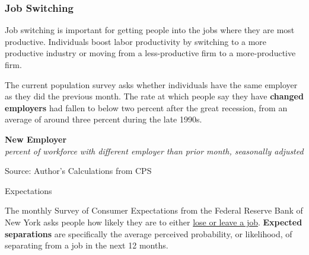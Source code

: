 \documentclass{report}
\makeatletter
\newcommand{\tbllink}[1]{\href{https://raw.githubusercontent.com/bdecon/US-chartbook/master/chartbook/data/#1}{\faTable}}
\newcommand*\short[1]{\expandafter\@gobbletwo\number\numexpr#1\relax}
\newcommand{\dateaxisticks}{
		date coordinates in=x, axis line style={draw=none},
		xmax={2024-01-31},
		max space between ticks=40,	    
		xtick={{1990-01-01}, {1992-01-01}, {1994-01-01}, 
			{1996-01-01}, {1998-01-01}, {2000-01-01}, 
			{2002-01-01}, {2004-01-01}, {2006-01-01},
			{2008-01-01}, {2010-01-01}, {2012-01-01}, {2014-01-01},
		    {2016-01-01}, {2018-01-01}, {2020-01-01}, {2022-01-01}, 
		    {2024-01-01}, {2026-01-01}},
		minor xtick={{1989-01-01}, {1991-01-01}, {1993-01-01},
			{1995-01-01}, {1997-01-01}, {1999-01-01}, 
			{2001-01-01}, {2003-01-01}, {2005-01-01}, {2007-01-01},
		    {2009-01-01}, {2011-01-01}, {2013-01-01}, {2015-01-01},
		    {2017-01-01}, {2019-01-01}, {2021-01-01}, {2023-01-01}, 
		    {2025-01-01}, {2027-01-01}},
		enlarge y limits={0.06}, enlarge x limits={0.01},
		xticklabel style={align=center, yshift=-2pt}, tick label style={inner sep=0pt},
		}
\newcommand{\stdline}[4]{\addplot[very thick, no markers, color=#1] 
		table [x=#2, y=#3, col sep=comma] {#4};	}
\newcommand{\thickline}[4]{\addplot[ultra thick, no markers, color=#1] 
		table [x=#2, y=#3, col sep=comma] {#4};	}
\newcommand{\rebars}{
		\fill[color=black!10] (axis cs:{2007-12-01},\pgfkeysvalueof{/pgfplots/ymin}) 
			rectangle (axis cs:{2009-07-01}, \pgfkeysvalueof{/pgfplots/ymax});
		\fill[color=black!10] (axis cs:{2001-03-01},\pgfkeysvalueof{/pgfplots/ymin}) 
			rectangle (axis cs:{2001-11-01}, \pgfkeysvalueof{/pgfplots/ymax});
		\fill[color=black!10] (axis cs:{2020-02-01},\pgfkeysvalueof{/pgfplots/ymin}) 
			rectangle (axis cs:{2020-05-01}, \pgfkeysvalueof{/pgfplots/ymax});}
\makeatother
\begin{document}
{\begin{minipage}{1.0\textwidth}
\subsubsection*{Job Switching}
\small Job switching is important for getting people into the jobs where they are most productive. Individuals boost labor productivity by switching to a more productive industry or moving from a less-productive firm to a more-productive firm. 

The current population survey asks whether individuals have the same employer as they did the previous month. The rate at which people say they have \textbf{changed employers} had fallen to below two percent after the great recession, from an average of around three percent during the late 1990s. 

 
\vspace{0.5mm}

\normalsize \textbf{New Employer}\\
\footnotesize{\textit{percent of workforce with different employer than prior month, seasonally adjusted}}
\vspace{3.55cm}

\hspace{1mm} 

\footnotesize{Source: Author's Calculations from CPS} \hfill \tbllink{jobswitch.csv} 
\vspace{4mm}

\normalsize Expectations
\vspace*{-1mm}

\small The monthly Survey of Consumer Expectations from the Federal Reserve Bank of New York asks people how likely they are to either \href{https://www.newyorkfed.org/microeconomics/sce#/jobsep-1}{lose or leave a job}. \textbf{Expected separations} are specifically the average perceived probability, or likelihood, of separating from a job in the next 12 months. 
\end{minipage}
\vspace{0.5mm}

}
\end{document}
